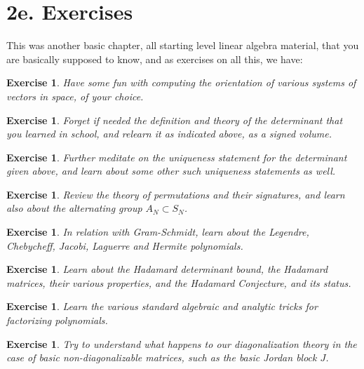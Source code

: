 \documentclass[12pt]{amsbook}
\newtheorem{exercise}[theorem]{Exercise}
\begin{document}
\section*{2e. Exercises}

This was another basic chapter, all starting level linear algebra material, that you are basically supposed to know, and as exercises on all this, we have:

\begin{exercise}
Have some fun with computing the orientation of various systems of vectors in space, of your choice.
\end{exercise}

\begin{exercise}
Forget if needed the definition and theory of the determinant that you learned in school, and relearn it as indicated above, as a signed volume.
\end{exercise}

\begin{exercise}
Further meditate on the uniqueness statement for the determinant given above, and learn about some other such uniqueness statements as well.
\end{exercise}

\begin{exercise}
Review the theory of permutations and their signatures, and learn also about the alternating group $A_N\subset S_N$.
\end{exercise}

\begin{exercise}
In relation with Gram-Schmidt, learn about the Legendre, Chebycheff, Jacobi, Laguerre and Hermite polynomials.
\end{exercise}

\begin{exercise}
Learn about the Hadamard determinant bound, the Hadamard matrices, their various properties, and the Hadamard Conjecture, and its status.
\end{exercise}

\begin{exercise}
Learn the various standard algebraic and analytic tricks for factorizing polynomials.
\end{exercise}

\begin{exercise}
Try to understand what happens to our diagonalization theory in the case of basic non-diagonalizable matrices, such as the basic Jordan block $J$.
\end{exercise}
\end{document}
